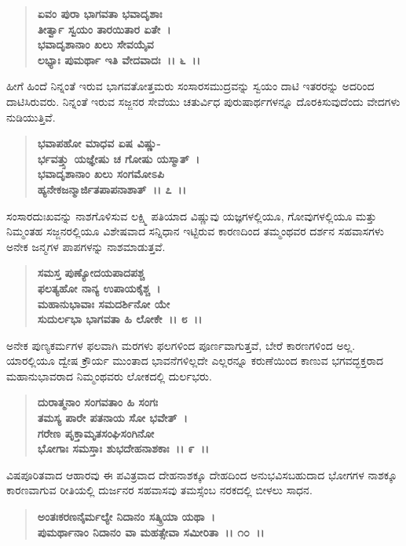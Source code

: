 \begin{verse}
\textbf{ಏವಂ ಪುರಾ ಭಾಗವತಾ ಭವಾದೃಶಾಃ} \\\textbf{ತೀರ್ತ್ವಾ ಸ್ವಯಂ ತಾರಯಿತಾರ ಏತೇ~।}\\\textbf{ಭವಾದೃಶಾನಾಂ ಖಲು ಸೇವಯೈವ} \\\textbf{ಲಭ್ಯಾಃ ಪುಮರ್ಥಾ ಇತಿ ವೇದವಾದಃ~।। ೬~।।}
\end{verse}

ಹೀಗೆ ಹಿಂದೆ ನಿನ್ನಂತೆ ಇರುವ ಭಾಗವತೋತ್ತಮರು ಸಂಸಾರಸಮುದ್ರವನ್ನು ಸ್ವಯಂ ದಾಟಿ ಇತರರನ್ನು ಅದರಿಂದ ದಾಟಿಸಿರುವರು. ನಿನ್ನಂತೆ ಇರುವ ಸಜ್ಜನರ ಸೇವೆಯು ಚತುರ್ವಿಧ ಪುರುಷಾರ್ಥಗಳನ್ನೂ ದೊರಕಿಸುವುದೆಂದು ವೇದಗಳು ನುಡಿಯುತ್ತಿವೆ.

\begin{verse}
\textbf{ಭವಾಪಹೋ ಮಾಧವ ಏಷ ವಿಷ್ಣು-} \\\textbf{ರ್ಭವತ್ತ್ಸು ಯಜ್ಞೇಷು ಚ ಗೋಷು ಯಸ್ಮಾತ್~।}\\\textbf{ಭವಾದೃಶಾನಾಂ ಖಲು ಸಂಗಮೋಽಪಿ} \\\textbf{ಹ್ಯನೇಕಜನ್ಮಾರ್ಜಿತಪಾಪನಾಶಾತ್~।। ೭~।।}
\end{verse}

ಸಂಸಾರದುಃಖವನ್ನು ನಾಶಗೊಳಿಸುವ ಲಕ್ಷ್ಮಿ ಪತಿಯಾದ ವಿಷ್ಣುವು ಯಜ್ಞಗಳಲ್ಲಿಯೂ, ಗೋವುಗಳಲ್ಲಿಯೂ ಮತ್ತು ನಿಮ್ಮಂತಹ ಸಜ್ಜನರಲ್ಲಿಯೂ ವಿಶೇಷವಾದ ಸನ್ನಿಧಾನ ಇಟ್ಟಿರುವ ಕಾರಣದಿಂದ ತಮ್ಮಂಥವರ ದರ್ಶನ ಸಹವಾಸಗಳು ಅನೇಕ ಜನ್ಮಗಳ ಪಾಪಗಳನ್ನು ನಾಶಮಾಡುತ್ತವೆ.

\begin{verse}
\textbf{ಸಮಸ್ತ ಪುಣ್ಯೋದಯಪಾದಪಶ್ಚ} \\\textbf{ಫಲತ್ಯಹೋ ನಾನ್ಯ ಉಪಾಯಕೈಶ್ಚ~।}\\\textbf{ಮಹಾನುಭಾವಾಃ ಸಮದರ್ಶಿನೋ ಯೇ} \\\textbf{ಸುದುರ್ಲಭಾ ಭಾಗವತಾ ಹಿ ಲೋಕೇ~।। ೮~।।}
\end{verse}

ಅನೇಕ ಪುಣ್ಯಕರ್ಮಗಳ ಫಲವಾಗಿ ಮರಗಳು ಫಲಗಳಿಂದ ಪೂರ್ಣವಾಗುತ್ತವೆ, ಬೇರೆ ಕಾರಣಗಳಿಂದ ಅಲ್ಲ. ಯಾರಲ್ಲಿಯೂ ದ್ವೇಷ ಕ್ರೌರ್ಯ ಮುಂತಾದ ಭಾವನೆಗಳಿಲ್ಲದೇ ಎಲ್ಲರನ್ನೂ ಕರುಣೆಯಿಂದ ಕಾಣುವ ಭಗವದ್ಭಕ್ತರಾದ ಮಹಾನುಭಾವರಾದ ನಿಮ್ಮಂಥವರು ಲೋಕದಲ್ಲಿ ದುರ್ಲಭರು.

\begin{verse}
\textbf{ದುರಾತ್ಮನಾಂ ಸಂಗವತಾಂ ಹಿ ಸಂಗಃ} \\\textbf{ತಮಸ್ಯ ಪಾರೇ ಪತನಾಯ ಸೋ ಭವೇತ್~।}\\\textbf{ಗರೇಣ ಪೃಕ್ತಾಮೃತಸಂಘಿಸಂಗಿನೋ} \\\textbf{ಭೋಗಾಃ ಸಮಸ್ತಾಃ ಶುಭದೇಹನಾಶಕಾಃ~।। ೯~।।}
\end{verse}

ವಿಷಪೂರಿತವಾದ ಆಹಾರವು ಈ ಪವಿತ್ರವಾದ ದೇಹನಾಶಕ್ಕೂ ದೇಹದಿಂದ ಅನುಭವಿಸಬಹುದಾದ ಭೋಗಗಳ ನಾಶಕ್ಕೂ ಕಾರಣವಾಗುವ ರೀತಿಯಲ್ಲಿ ದುರ್ಜನರ ಸಹವಾಸವು ತಮಸ್ಸೆಂಬ ನರಕದಲ್ಲಿ ಬೀಳಲು ಸಾಧನ.

\begin{verse}
\textbf{ಅಂತಃಕರಣನೈರ್ಮಲ್ಯೇ ನಿದಾನಂ ಸತ್ಕ್ರಿಯಾ ಯಥಾ~।}\\\textbf{ಪುಮರ್ಥಾನಾಂ ನಿದಾನಂ ವಾ ಮಹತ್ಸೇವಾ ಸಮೀರಿತಾ~।। ೧೦~।।}
\end{verse}

